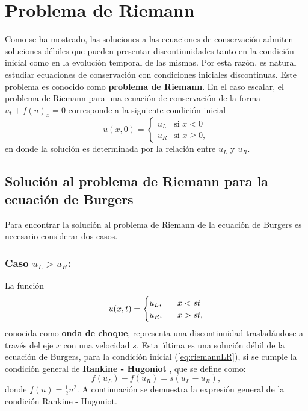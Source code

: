 \section{Problema de Riemann}
Como se ha mostrado, las soluciones a las ecuaciones de conservación admiten soluciones débiles que pueden presentar discontinuidades tanto en la condición inicial como en la evolución temporal de las mismas. Por esta razón, es natural estudiar ecuaciones de conservación con condiciones iniciales discontinuas. Este problema es conocido como \textbf{problema de Riemann}. En el caso escalar, el problema de Riemann para una ecuación de conservación de la forma $u_t + f(u)_x = 0$ corresponde a la siguiente condición inicial
\begin{equation}
	u(x,0) = 
	\begin{cases}
		u_L & \text{si } x < 0 \\
		u_R & \text{si } x \geq 0,
		\label{eq:riemannLR}
	\end{cases}
\end{equation}
en donde la solución es determinada por la relación entre $u_L$ y $u_R$.
\subsection{Solución al problema de Riemann para la ecuación de Burgers}
Para encontrar la solución al problema de Riemann de la ecuación de Burgers es necesario considerar dos casos.
\subsubsection{Caso $u_L > u_R$:}
La función
\begin{equation}
	u(x,t) = 
	\begin{cases}
		u_L, & \hspace{3mm} x < st \\
		u_R, & \hspace{3mm} x > st,		
	\end{cases}\label{eq:solriemannLR}
\end{equation}
conocida como \textbf{onda de choque}, representa una discontinuidad trasladándose a través del eje $x$ con una velocidad $s$. Esta última es una solución débil de la ecuación de Burgers, para la condición inicial (\ref{eq:riemannLR}), si se cumple la condición general de  \textbf{Rankine - Hugoniot} \cite{Cameron}, que se define como:
\begin{equation}
	f(u_L) - f(u_R) = s(u_L - u_R),
	\label{eq:rankinehugo}
\end{equation}
donde $f(u) = \frac{1}{2} u^{2}$. A continuación se demuestra la expresión general de la condición Rankine - Hugoniot.\\

